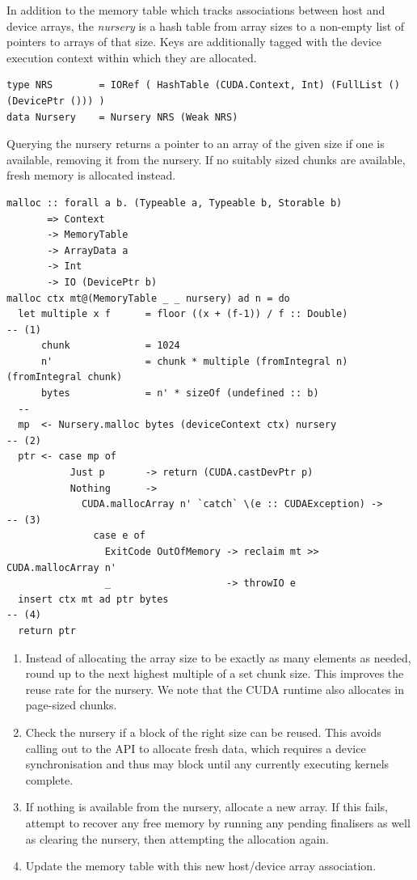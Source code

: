 In addition to the memory table which tracks associations between host and
device arrays, the \emph{nursery} is a hash table from array sizes to a
non-empty list of pointers to arrays of that size. Keys are additionally tagged
with the device execution context within which they are allocated.
%
\begin{lstlisting}[style=haskell]
type NRS        = IORef ( HashTable (CUDA.Context, Int) (FullList () (DevicePtr ())) )
data Nursery    = Nursery NRS (Weak NRS)
\end{lstlisting}
%
Querying the nursery returns a pointer to an array of the given size if one is
available, removing it from the nursery. If no suitably sized chunks are
available, fresh memory is allocated instead.
%
\begin{lstlisting}[style=haskell]
malloc :: forall a b. (Typeable a, Typeable b, Storable b)
       => Context
       -> MemoryTable
       -> ArrayData a
       -> Int
       -> IO (DevicePtr b)
malloc ctx mt@(MemoryTable _ _ nursery) ad n = do
  let multiple x f      = floor ((x + (f-1)) / f :: Double)             -- (1)
      chunk             = 1024
      n'                = chunk * multiple (fromIntegral n) (fromIntegral chunk)
      bytes             = n' * sizeOf (undefined :: b)
  --
  mp  <- Nursery.malloc bytes (deviceContext ctx) nursery               -- (2)
  ptr <- case mp of
           Just p       -> return (CUDA.castDevPtr p)
           Nothing      ->
             CUDA.mallocArray n' `catch` \(e :: CUDAException) ->       -- (3)
               case e of
                 ExitCode OutOfMemory -> reclaim mt >> CUDA.mallocArray n'
                 _                    -> throwIO e
  insert ctx mt ad ptr bytes                                            -- (4)
  return ptr
\end{lstlisting}
%
\begin{enumerate}
\item Instead of allocating the array size to be exactly as many elements as
    needed, round up to the next highest multiple of a set chunk size. This
    improves the reuse rate for the nursery. We note that the CUDA runtime also
    allocates in page-sized chunks.

\item Check the nursery if a block of the right size can be reused. This avoids
    calling out to the \CUDA API to allocate fresh data, which requires a
    device synchronisation and thus may block until any currently executing
    kernels complete.

\item If nothing is available from the nursery, allocate a new array. If this
    fails, attempt to recover any free memory by running any pending finalisers
    as well as clearing the nursery, then attempting the allocation again.

\item Update the memory table with this new host/device array association.

\end{enumerate}


